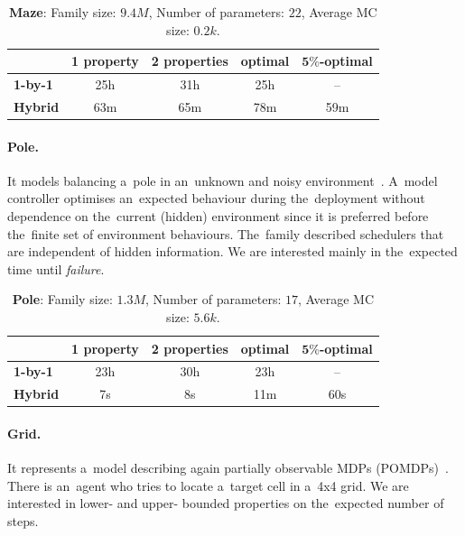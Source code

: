 \begin{table}[h!]
\centering
\begin{tabular}{l|cccc}
    \hline \hline 
    & \multicolumn{1}{l}{\textbf{1 property}} & \multicolumn{1}{l}{\textbf{2 properties}} & \multicolumn{1}{l}{\textbf{optimal}} & \multicolumn{1}{l}{\textbf{$\mathbf{5\%}$-optimal}} \\ \hline
    \textbf{1-by-1} & 25h & 31h & 25h & \,--\, \\
    \textbf{Hybrid} & 63m & 65m & 78m & 59m \\ \hline \hline
\end{tabular}
\caption{\textbf{Maze}:  Family size: $9.4M$, Number of parameters: $22$, Average MC size: $0.2k$.}
\end{table}

\vspace*{-0.4cm}
\paragraph{Pole.}
It models balancing a~pole in an~unknown and noisy environment~\cite{pole}.
A~model controller optimises an~expected behaviour during the~deployment without dependence on the~current (hidden) environment since it is preferred before the~finite set of environment behaviours.
The~family described schedulers that are independent of hidden information.
We are interested mainly in the~expected time until \emph{failure}.

\begin{table}[h!]
\centering
\begin{tabular}{l|cccc}
    \hline \hline 
    & \multicolumn{1}{l}{\textbf{1 property}} & \multicolumn{1}{l}{\textbf{2 properties}} & \multicolumn{1}{l}{\textbf{optimal}} & \multicolumn{1}{l}{\textbf{$\mathbf{5\%}$-optimal}} \\ \hline
    \textbf{1-by-1} & 23h & 30h & 23h & \,--\, \\
    \textbf{Hybrid} & 7s & 8s & 11m & 60s \\ \hline \hline
\end{tabular}
\caption{\textbf{Pole}:  Family size: $1.3M$, Number of parameters: $17$, Average MC size: $5.6k$.}
\end{table}

\vspace*{-0.4cm}
\paragraph{Grid.}
It represents a~model describing again partially observable MDPs (POMDPs)~\cite{pomdp1}.
There is an~agent who tries to locate a~target cell in a~4x4 grid.
We are interested in lower- and upper- bounded properties on the~expected number of steps.

